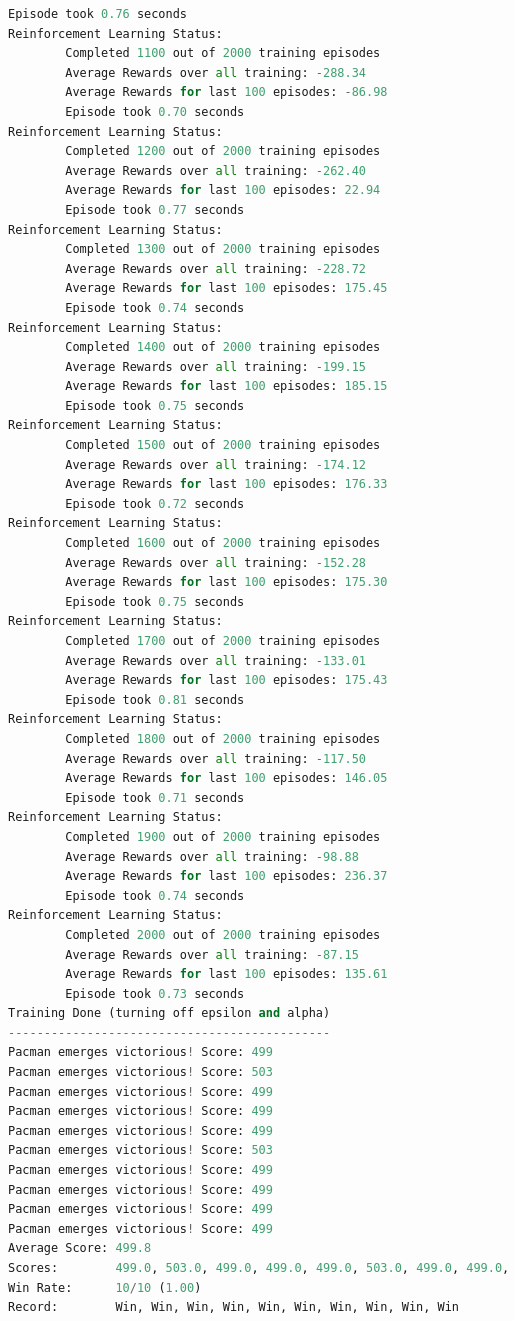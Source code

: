 \documentclass{report}
\begin{document}
\begin{lstlisting}[language=Python, caption=Ejecución de Q-Learning y Pacman 1]
        Episode took 0.76 seconds
Reinforcement Learning Status:
        Completed 1100 out of 2000 training episodes
        Average Rewards over all training: -288.34
        Average Rewards for last 100 episodes: -86.98
        Episode took 0.70 seconds
Reinforcement Learning Status:
        Completed 1200 out of 2000 training episodes
        Average Rewards over all training: -262.40
        Average Rewards for last 100 episodes: 22.94
        Episode took 0.77 seconds
Reinforcement Learning Status:
        Completed 1300 out of 2000 training episodes
        Average Rewards over all training: -228.72
        Average Rewards for last 100 episodes: 175.45
        Episode took 0.74 seconds
Reinforcement Learning Status:
        Completed 1400 out of 2000 training episodes
        Average Rewards over all training: -199.15
        Average Rewards for last 100 episodes: 185.15
        Episode took 0.75 seconds
Reinforcement Learning Status:
        Completed 1500 out of 2000 training episodes
        Average Rewards over all training: -174.12
        Average Rewards for last 100 episodes: 176.33
        Episode took 0.72 seconds
Reinforcement Learning Status:
        Completed 1600 out of 2000 training episodes
        Average Rewards over all training: -152.28
        Average Rewards for last 100 episodes: 175.30
        Episode took 0.75 seconds
Reinforcement Learning Status:
        Completed 1700 out of 2000 training episodes
        Average Rewards over all training: -133.01
        Average Rewards for last 100 episodes: 175.43
        Episode took 0.81 seconds
Reinforcement Learning Status:
        Completed 1800 out of 2000 training episodes
        Average Rewards over all training: -117.50
        Average Rewards for last 100 episodes: 146.05
        Episode took 0.71 seconds
Reinforcement Learning Status:
        Completed 1900 out of 2000 training episodes
        Average Rewards over all training: -98.88
        Average Rewards for last 100 episodes: 236.37
        Episode took 0.74 seconds
Reinforcement Learning Status:
        Completed 2000 out of 2000 training episodes
        Average Rewards over all training: -87.15
        Average Rewards for last 100 episodes: 135.61
        Episode took 0.73 seconds
Training Done (turning off epsilon and alpha)
---------------------------------------------
Pacman emerges victorious! Score: 499
Pacman emerges victorious! Score: 503
Pacman emerges victorious! Score: 499
Pacman emerges victorious! Score: 499
Pacman emerges victorious! Score: 499
Pacman emerges victorious! Score: 503
Pacman emerges victorious! Score: 499
Pacman emerges victorious! Score: 499
Pacman emerges victorious! Score: 499
Pacman emerges victorious! Score: 499
Average Score: 499.8
Scores:        499.0, 503.0, 499.0, 499.0, 499.0, 503.0, 499.0, 499.0, 499.0, 499.0
Win Rate:      10/10 (1.00)
Record:        Win, Win, Win, Win, Win, Win, Win, Win, Win, Win
\end{lstlisting}
\end{document}
